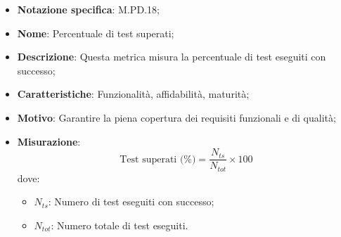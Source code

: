 \begin{itemize}
    \item \textbf{Notazione specifica}: M.PD.18;
    \item \textbf{Nome}: Percentuale di test superati;
    \item \textbf{Descrizione}: Questa metrica misura la percentuale di test eseguiti con successo;
    \item \textbf{Caratteristiche}: Funzionalità, affidabilità, maturità;
    \item \textbf{Motivo}: Garantire la piena copertura dei requisiti funzionali e di qualità;
    \item \textbf{Misurazione}:
    \[
    \text{Test superati (\%)} = \frac{N_{ts}}{N_{tot}} \times 100
    \]
    dove:
    \begin{itemize}
        \item $N_{ts}$: Numero di test eseguiti con successo;
        \item $N_{tot}$: Numero totale di test eseguiti.
    \end{itemize}
\end{itemize}
